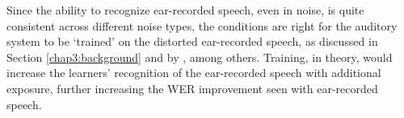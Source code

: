 % 






Since the ability to recognize ear-recorded speech, even in noise, is quite consistent across different noise types, the conditions are right for the auditory system to be `trained' on the distorted ear-recorded speech, as discussed in Section \ref{chap3:background} and by \cite{mattys:12}, among others.  Training, in theory, would increase the learners' recognition of the ear-recorded speech with additional exposure, further increasing the WER improvement seen with ear-recorded speech.




